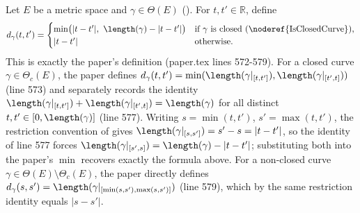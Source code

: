 \begin{definition}
  Let $E$ be a metric space and $\gamma \in \Theta(E)$ (). For $t, t' \in \mathbb{R}$,
  define
  \[
    d_\gamma(t,t') =
    \begin{cases}
      \min\bigl(|t-t'|,\ \length(\gamma) - |t-t'|\bigr) & \text{if $\gamma$ is closed
        (\noderef{IsClosedCurve}),} \\
      |t-t'| & \text{otherwise.}
    \end{cases}
  \]
  This is exactly the paper's definition (paper.tex lines 572-579). For a closed curve
  $\gamma \in \Theta_c(E)$, the paper defines $d_\gamma(t,t') = \min(\length(\gamma|_{[t,t']}),
  \length(\gamma|_{[t',t]}))$ (line 573) and separately records the identity
  $\length(\gamma|_{[t,t']}) + \length(\gamma|_{[t',t]}) = \length(\gamma)$ for all distinct
  $t,t' \in [0,\length(\gamma)]$ (line 577). Writing $s = \min(t,t')$, $s' = \max(t,t')$, the
  restriction convention of  gives $\length(\gamma|_{[s,s']}) = s'-s =
  |t-t'|$, so the identity of line 577 forces
  $\length(\gamma|_{[s',s]}) = \length(\gamma) - |t-t'|$; substituting both into the paper's
  $\min$ recovers exactly the formula above. For a non-closed curve
  $\gamma \in \Theta(E) \setminus \Theta_c(E)$, the paper directly defines
  $d_\gamma(s,s') = \length(\gamma|_{[\min(s,s'),\max(s,s')]})$ (line 579), which by the same
  restriction identity equals $|s-s'|$.
\end{definition}
